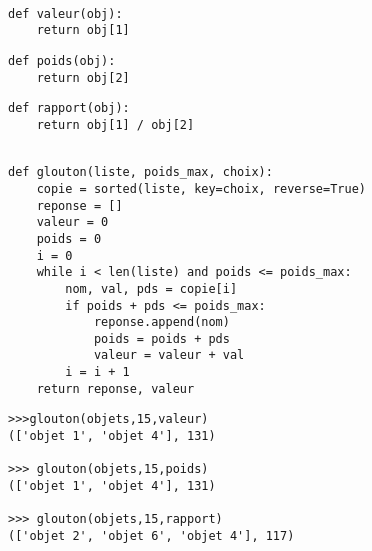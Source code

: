 


\begin{lstlisting}

def valeur(obj):
    return obj[1]

\end{lstlisting}


\begin{lstlisting}
def poids(obj):
    return obj[2]

\end{lstlisting}



\begin{lstlisting}
def rapport(obj):
    return obj[1] / obj[2]
\end{lstlisting}



\begin{lstlisting}

def glouton(liste, poids_max, choix):
    copie = sorted(liste, key=choix, reverse=True)
    reponse = []
    valeur = 0
    poids = 0
    i = 0
    while i < len(liste) and poids <= poids_max:
        nom, val, pds = copie[i]
        if poids + pds <= poids_max:
            reponse.append(nom)
            poids = poids + pds
            valeur = valeur + val
        i = i + 1
    return reponse, valeur

\end{lstlisting}


\begin{lstlisting}
>>>glouton(objets,15,valeur)
(['objet 1', 'objet 4'], 131)

>>> glouton(objets,15,poids)
(['objet 1', 'objet 4'], 131)

>>> glouton(objets,15,rapport)
(['objet 2', 'objet 6', 'objet 4'], 117)

\end{lstlisting}

